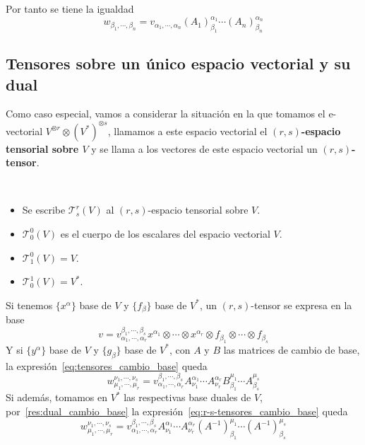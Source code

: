 Por tanto se tiene la igualdad
\begin{equation}
  \label{eq:tensores_cambio_base}
  w_{\beta_1,\cdots,\beta_n}=v_{\alpha_1,\cdots,\alpha_n}(A_1)^{\alpha_1}_{\beta_1}\cdots (A_n)^{\alpha_n}_{\beta_n}
\end{equation}

\subsection{Tensores sobre un único espacio vectorial y su
dual}\label{subsec:tensores-sobre-un-unico-espacio-vectorial-y-su-dual}
Como caso especial, vamos a considerar la situación en la que tomamos el e-vectorial
$V^{\otimes r}\otimes (V^*)^{\otimes s}$, llamamos a este espacio vectorial el \textbf{$(r,s)$-espacio tensorial sobre $V$}
y se llama a los vectores de este espacio vectorial un \textbf{$(r,s)$-tensor}.
\begin{notation}
  \
  \begin{itemize}
    \item Se escribe $\mathcal{T}^r_s(V)$ al $(r,s)$-espacio tensorial sobre $V$.
    \item $\mathcal{T}^0_0(V)$ es el cuerpo de los escalares del espacio vectorial $V$.
    \item $\mathcal{T}^0_1(V) = V$.
    \item $\mathcal{T}^1_0(V)=V^*$.
  \end{itemize}
\end{notation}

Si tenemos $\{x^\alpha\}$ base de $V$ y $\{f_\beta\}$ base de $V^*$, un $(r,s)$-tensor se expresa en la base
\begin{equation}
  \label{eq:r-s-tensor-componentes}
  v=v_{\alpha_1,\cdots,\alpha_r}^{\beta_1,\cdots, \beta_s} x^{\alpha_1}\otimes\cdots\otimes x^{\alpha_r}\otimes f_{\beta_1}\otimes\cdots\otimes f_{\beta_s}
\end{equation}
Y si $\{y^\alpha\}$ base de $V$ y $\{g_\beta\}$ base de $V^*$, con $A$ y $B$ las matrices de cambio de base, la expresión~\ref{eq:tensores_cambio_base}
queda
\begin{equation}
  \label{eq:r-s-tensores_cambio_base}
  w_{\mu_1,\cdots,\mu_r}^{\nu_1,\cdots, \nu_s}=v_{\alpha_1,\cdots,\alpha_r}^{\beta_1,\cdots, \beta_s}A^{\alpha_1}_{\nu_1}\cdots A^{\alpha_r}_{\nu_r}B_{\beta_1}^{\mu_1}\cdots A_{\beta_s}^{\mu_s}
\end{equation}
Si además, tomamos en $V^*$ las respectivas base duales de $V$, por~\ref{res:dual_cambio_base} la expresión~\ref{eq:r-s-tensores_cambio_base}
queda
\begin{equation}
  \label{eq:r-s-tensores_cambio_base_dual}
  w_{\mu_1,\cdots,\mu_r}^{\nu_1,\cdots, \nu_s}=v_{\alpha_1,\cdots,\alpha_r}^{\beta_1,\cdots, \beta_s}A^{\alpha_1}_{\nu_1}\cdots A^{\alpha_r}_{\nu_r}(A^{-1})_{\beta_1}^{\mu_1}\cdots (A^{-1})_{\beta_s}^{\mu_s}
\end{equation}